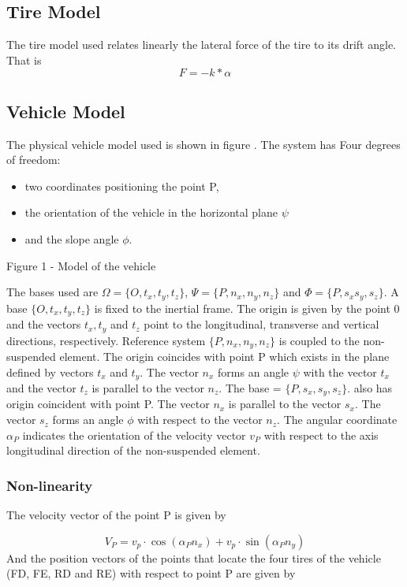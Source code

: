 \documentclass[sublist,a4paper,twoside,11pt]{article}
\begin{document}
\subsection{Tire Model}
The tire model used relates linearly the lateral force of the tire to its drift angle. That is
\[ F=-k*\alpha\]

\subsection{Vehicle Model}
The physical vehicle model used is shown in figure . The system has Four degrees of freedom: 
\begin{itemize}
\item two coordinates positioning the point P, 
\item the orientation of the vehicle in the horizontal plane $\psi$ 
\item and the slope angle $\phi$.
\end{itemize}
	
	Figure 1 - Model of the vehicle
	
	
The bases used are $\Omega = \{O,t_x, t_y, t_z \}$, $\Psi = \{P, n_x, n_y, n_z \}$ and $\Phi = \{P,s_x s_y,s_z\}$. A base $\{O,t_x, t_y,t_z \}$ is fixed to the inertial frame. The origin is given by the point 0 and the vectors $t_x, t_y$ and $t_z$ point to the longitudinal, transverse and vertical directions, respectively. Reference system $\{P, n_x, n_y, n_z\}$ is coupled to the non-suspended element. The origin coincides with point P which exists in the plane defined by vectors $t_x$ and $t_y$. The vector $n_x$ forms an angle $\psi$ with the vector $t_x$ and the vector $t_z$ is parallel to the vector $n_z$. The base = $\{P,s_x, s_y,s_z\}$. also has origin coincident with point P. The vector $n_x$ is parallel to the vector $s_x$. The vector $s_z$ forms an angle $\phi$ with respect to the vector $n_z$. The angular coordinate $\alpha_P$ indicates the orientation of the velocity vector $v_P$ with respect to the axis longitudinal direction of the non-suspended element.
	
\subsubsection{Non-linearity}

The velocity vector of the point P is given by

\[
V_P = v_p\cdot \cos(\alpha_Pn_x) + v_p\cdot \sin(\alpha_P n_y)
\]
And the position vectors of the points that locate the four tires of the vehicle (FD, FE, RD and RE) with respect to point P are given by
\end{document}
